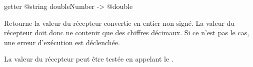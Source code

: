 
\begin{galgas3box}
getter @string doubleNumber -> @double
\end{galgas3box}

Retourne la valeur du récepteur convertie en entier non signé. La valeur du récepteur doit donc ne contenir que des chiffres décimaux. Si ce n'est pas le cas, une erreur d'exécution est déclenchée.

La valeur du récepteur peut être testée en appelant le .

%





